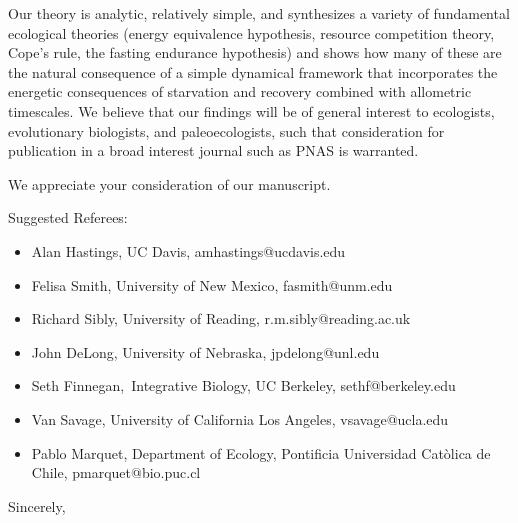 \documentclass[ucm,12pt]{ucletter}
\begin{document}
\begin{letter}
Our theory is analytic, relatively simple, and synthesizes a variety of fundamental ecological theories (energy equivalence hypothesis, resource competition theory, Cope’s rule, the fasting endurance hypothesis) and shows how many of these are the natural consequence of a simple dynamical framework that incorporates the energetic consequences of starvation and recovery combined with allometric timescales. We believe that our findings will be of general interest to ecologists, evolutionary biologists, and paleoecologists, such that consideration for publication in a broad interest journal such as PNAS is warranted.

We appreciate your consideration of our manuscript.

Suggested Referees:
\begin{itemize}
\item[] Alan Hastings, UC Davis, amhastings@ucdavis.edu
\item[] Felisa Smith, University of New Mexico, fasmith@unm.edu
\item[] Richard Sibly, University of Reading, r.m.sibly@reading.ac.uk
\item[] John DeLong, University of Nebraska, jpdelong@unl.edu
\item[] Seth Finnegan, Integrative Biology, UC Berkeley, sethf@berkeley.edu
\item[] Van Savage, University of California Los Angeles, vsavage@ucla.edu
\item[] Pablo Marquet, Department of Ecology, Pontificia Universidad Cat\`olica de Chile, pmarquet@bio.puc.cl
\end{itemize}

\vspace{5mm}

\singlespacing
\closing{Sincerely,\\
\\
}

\end{letter}
\end{document}
